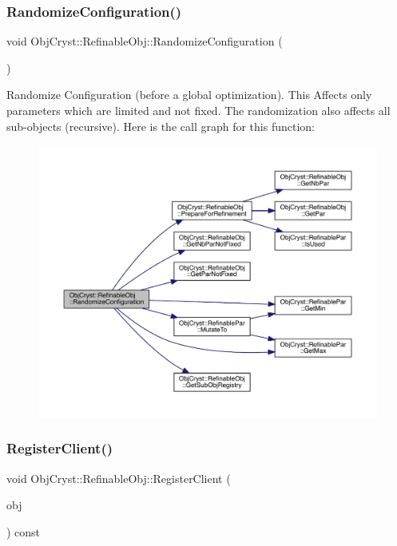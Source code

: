 \subsubsection{\texorpdfstring{RandomizeConfiguration()}{RandomizeConfiguration()}}
{\footnotesize\ttfamily void Obj\+Cryst\+::\+Refinable\+Obj\+::\+Randomize\+Configuration (\begin{DoxyParamCaption}{ }\end{DoxyParamCaption})\hspace{0.3cm}{\ttfamily [virtual]}}

Randomize Configuration (before a global optimization). This Affects only parameters which are limited and not fixed. The randomization also affects all sub-\/objects (recursive). Here is the call graph for this function\+:
\nopagebreak
\begin{figure}[H]
\begin{center}
\leavevmode
\includegraphics[width=350pt]{class_obj_cryst_1_1_refinable_obj_ae0d568b66a8bfe39ebbb648d68a57239_cgraph}
\end{center}
\end{figure}
\mbox{\label{class_obj_cryst_1_1_refinable_obj_a19bf35f9dd14319f8ae79828ce67bd70}} 
\subsubsection{\texorpdfstring{RegisterClient()}{RegisterClient()}}
{\footnotesize\ttfamily void Obj\+Cryst\+::\+Refinable\+Obj\+::\+Register\+Client (\begin{DoxyParamCaption}\item[{\mbox{\hyperlink{class_obj_cryst_1_1_refinable_obj}{Refinable\+Obj}} \&}]{obj }\end{DoxyParamCaption}) const\hspace{0.3cm}{\ttfamily [virtual]}}

